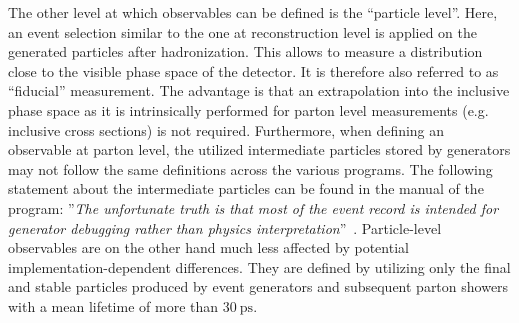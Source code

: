 
The other level at which observables can be defined is the ``particle level''. Here, an event selection similar to the one at reconstruction level is applied on the generated particles after hadronization. This allows to measure a distribution close to the visible phase space of the detector. It is therefore also referred to as ``fiducial'' measurement. The advantage is that an extrapolation into the inclusive phase space as it is intrinsically performed for parton level measurements (e.g. inclusive cross sections) is not required. Furthermore, when defining an observable at parton level, the utilized intermediate particles stored by generators may not follow the same definitions across the various programs. The following statement about the  intermediate particles can be found in the manual of the \RIVET program: ''\textsl{The unfortunate truth is that most of the event record is intended for generator debugging rather than physics interpretation}''~\cite{Buckley:2010ar}. Particle-level observables are on the other hand much less affected by potential implementation-dependent differences. They are defined by utilizing only the final and stable particles produced by event generators and subsequent parton showers with a mean lifetime of more than $30~\mathrm{ps}$.

